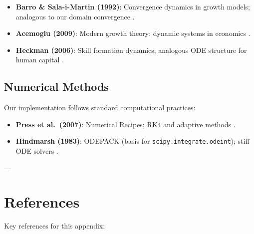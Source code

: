 \begin{itemize}
\item \textbf{Barro \& Sala-i-Martin (1992)}: Convergence dynamics in growth models;
      analogous to our domain convergence \citep{barro1992convergence}.

\item \textbf{Acemoglu (2009)}: Modern growth theory; dynamic systems in economics
      \citep{acemoglu2009introduction}.

\item \textbf{Heckman (2006)}: Skill formation dynamics; analogous ODE structure
      for human capital \citep{heckman2006skill}.
\end{itemize}

\subsection{Numerical Methods}

Our implementation follows standard computational practices:

\begin{itemize}
\item \textbf{Press et al.~(2007)}: Numerical Recipes; RK4 and adaptive methods
      \citep{press2007numerical}.

\item \textbf{Hindmarsh (1983)}: ODEPACK (basis for \texttt{scipy.integrate.odeint});
      stiff ODE solvers \citep{hindmarsh1983odepack}.
\end{itemize}

---


\section*{References}

\nocite{bcm_master}

Key references for this appendix:

